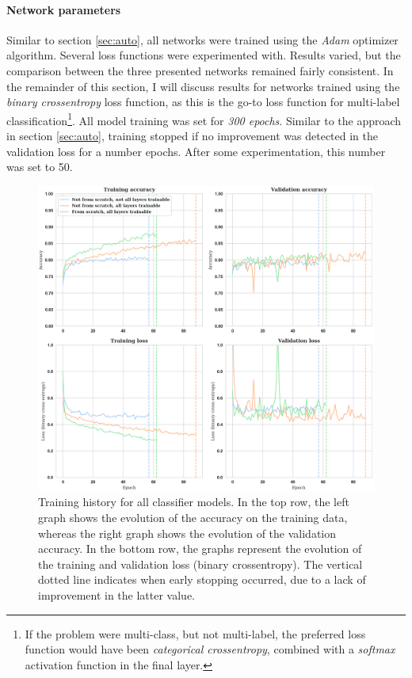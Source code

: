\paragraph{Network parameters}
Similar to section \textcolor{blue}{\ref{sec:auto}}, all networks were trained using the \textit{Adam} optimizer algorithm. Several loss functions were experimented with. Results varied, but the comparison between the three presented networks remained fairly consistent. In the remainder of this section, I will discuss results for networks trained using the \textit{binary crossentropy} loss function, as this is the go-to loss function for multi-label classification\footnote{If the problem were multi-class, but not multi-label, the preferred loss function would have been \textit{categorical crossentropy}, combined with a \textit{softmax} activation function in the final layer.}. All model training was set for \textit{300 epochs}. Similar to the approach in section \textcolor{blue}{\ref{sec:auto}}, training stopped if no improvement was detected in the validation loss for a number epochs. After some experimentation, this number was set to 50.

\begin{figure}[!htbp]
	\begin{center}
		\includegraphics[width=\linewidth, keepaspectratio]{images/class_histories}
		\caption{Training history for all classifier models. In the top row, the left graph shows the evolution of the accuracy on the training data, whereas the right graph shows the evolution of the validation accuracy. In the bottom row, the graphs represent the evolution of the training and validation loss (binary crossentropy). The vertical dotted line indicates when early stopping occurred, due to a lack of improvement in the latter value.}
		\label{fig:class_histories}
	\end{center}
\end{figure}


